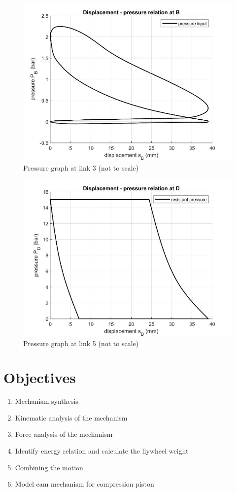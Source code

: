 \begin{figure}[ht]
	\centering
	\includegraphics{2.2a}
	\caption{Pressure graph at link 3 (not to scale)}
	\label{fig:2a}
\end{figure}
\begin{figure}[ht]
	\centering
	\includegraphics{2.2b}
	\caption{Pressure graph at link 5 (not to scale)}
	\label{fig:2b}
\end{figure}
\section{Objectives}
\begin{enumerate}
	\item Mechanism synthesis
	\item Kinematic analysis of the mechanism
	\item Force  analysis of the mechanism
	\item Identify energy relation and calculate the flywheel weight
	\item Combining the motion
	\item Model cam mechanism for compression piston
\end{enumerate}
